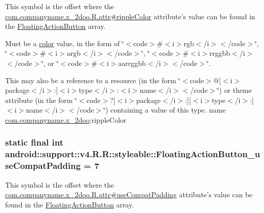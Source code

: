 This symbol is the offset where the \hyperlink{classcom_1_1companyname_1_1x__2doo_1_1_r_1_1attr_63d6e91e446c8128178a420a03732e41}{com.companyname.x\_\-2doo.R.attr\#rippleColor} attribute's value can be found in the \hyperlink{classandroid_1_1support_1_1v4_1_1_r_1_1styleable_51a0276d7190a1195d58170b1623ab3c}{FloatingActionButton} array.

Must be a \hyperlink{classandroid_1_1support_1_1v4_1_1_r_1_1color}{color} value, in the form of \char`\"{}$<$code$>$\#$<$i$>$rgb$<$/i$>$$<$/code$>$\char`\"{}, \char`\"{}$<$code$>$\#$<$i$>$argb$<$/i$>$$<$/code$>$\char`\"{}, \char`\"{}$<$code$>$\#$<$i$>$rrggbb$<$/i$>$$<$/code$>$\char`\"{}, or \char`\"{}$<$code$>$\#$<$i$>$aarrggbb$<$/i$>$$<$/code$>$\char`\"{}. 

This may also be a reference to a resource (in the form \char`\"{}$<$code$>$@\mbox{[}$<$i$>$package$<$/i$>$:\mbox{]}$<$i$>$type$<$/i$>$:$<$i$>$name$<$/i$>$$<$/code$>$\char`\"{}) or theme attribute (in the form \char`\"{}$<$code$>$?\mbox{[}$<$i$>$package$<$/i$>$:\mbox{]}\mbox{[}$<$i$>$type$<$/i$>$:\mbox{]}$<$i$>$name$<$/i$>$$<$/code$>$\char`\"{}) containing a value of this type.  name \hyperlink{namespacecom_1_1companyname_1_1x__2doo}{com.companyname.x\_\-2doo}:rippleColor \hypertarget{classandroid_1_1support_1_1v4_1_1_r_1_1styleable_ae0dde9e7a05bead4f8562d2d2696661}{
\subsubsection[{FloatingActionButton\_\-useCompatPadding}]{\setlength{\rightskip}{0pt plus 5cm}static final int android::support::v4.R.R::styleable::FloatingActionButton\_\-useCompatPadding = 7}}
\label{classandroid_1_1support_1_1v4_1_1_r_1_1styleable_ae0dde9e7a05bead4f8562d2d2696661}


This symbol is the offset where the \hyperlink{classcom_1_1companyname_1_1x__2doo_1_1_r_1_1attr_5766848d838192d625703690cc6213fc}{com.companyname.x\_\-2doo.R.attr\#useCompatPadding} attribute's value can be found in the \hyperlink{classandroid_1_1support_1_1v4_1_1_r_1_1styleable_51a0276d7190a1195d58170b1623ab3c}{FloatingActionButton} array.

